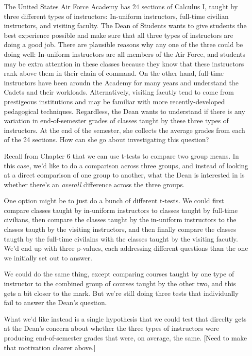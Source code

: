 \documentclass[]{book}
\theoremstyle{definition}
\theoremstyle{definition}
\theoremstyle{definition}
\theoremstyle{remark}
\begin{document}
The United States Air Force Academy has 24 sections of Calculus I,
taught by three different types of instructors: In-uniform instructors,
full-time civilian instructors, and visiting faculty. The Dean of
Students wants to give students the best experience possible and make
sure that all three types of instructors are doing a good job. There are
plausible reasons why any one of the three could be doing well:
In-uniform instructors are all members of the Air Force, and students
may be extra attention in these classes because they know that these
instructors rank above them in their chain of command. On the other
hand, full-time instructors have been aroudn the Academy for many years
and understand the Cadets and their workloads. Alternatively, visiting
facutly tend to come from prestigeous institutions and may be familiar
with more recently-developed pedagogical techniques. Regardless, the
Dean wants to understand if there is any variation in end-of-semester
grades of classes taught by these three types of instructors. At the end
of the semester, she collects the average grades from each of the 24
sections. How can she go about investigating this question?

Recall from Chapter 6 that we can use t-tests to compare two group
means. In this case, we'd like to do a comparison across three groups,
and instead of looking at a direct comparison of one group to another,
what the Dean is interested in is whether there's an \emph{overall}
difference across the three groups.

One option might be to just do a bunch of different t-tests. We could
first compare classes taught by in-uniform instructors to classes taught
by full-time civilians, then compare the classes taught by the
in-uniform instructors to the classes taugth by the visiting
instructors, and then finally compare the classes taugth by the
full-time civilains with the classes taught by the visiting facutly.
We'd end up with three p-values, each addressing different questions
than the one we initially set out to answer.

We could do the same thing, except comparing courses taught by one type
of instructor to the combined group of courses taught by the other two,
and this gets a bit closer to the mark. But we're still doing three
tests that individually fail to answer the Dean's question.

What we'd like instead is a single hypothesis that we could test that
direclty gets at the Dean's concern about whether the three types of
instructors were producing end-of-semester grades that were, on average,
the same. {[}Need to make that motivation clearer above.{]}
\end{document}
